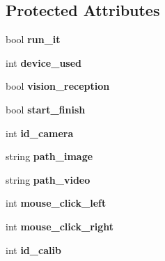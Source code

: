 \subsection*{Protected Attributes}
\begin{DoxyCompactItemize}
\item 
bool {\bfseries run\+\_\+it}\hypertarget{classcalibration_a3b4703e9670b0c80359bae2747878245}{}\label{classcalibration_a3b4703e9670b0c80359bae2747878245}

\item 
int {\bfseries device\+\_\+used}\hypertarget{classcalibration_a5f6ca76dc8c0fbf33f1c6a604b72cdc0}{}\label{classcalibration_a5f6ca76dc8c0fbf33f1c6a604b72cdc0}

\item 
bool {\bfseries vision\+\_\+reception}\hypertarget{classcalibration_a9606829157d28f46f87febceb67ba14c}{}\label{classcalibration_a9606829157d28f46f87febceb67ba14c}

\item 
bool {\bfseries start\+\_\+finish}\hypertarget{classcalibration_aa3b093eb7694fdcb78408efdeb331e01}{}\label{classcalibration_aa3b093eb7694fdcb78408efdeb331e01}

\item 
int {\bfseries id\+\_\+camera}\hypertarget{classcalibration_abb71e83b1caac73be1f8a5ec9ff85f5f}{}\label{classcalibration_abb71e83b1caac73be1f8a5ec9ff85f5f}

\item 
string {\bfseries path\+\_\+image}\hypertarget{classcalibration_ab5b38c34686e2d0ef790f5ea1bf022d2}{}\label{classcalibration_ab5b38c34686e2d0ef790f5ea1bf022d2}

\item 
string {\bfseries path\+\_\+video}\hypertarget{classcalibration_ac3b22d58acc42fb7c8217518f6ea4846}{}\label{classcalibration_ac3b22d58acc42fb7c8217518f6ea4846}

\item 
int {\bfseries mouse\+\_\+click\+\_\+left}\hypertarget{classcalibration_ada27036ba780db458e9dc14f13f0809a}{}\label{classcalibration_ada27036ba780db458e9dc14f13f0809a}

\item 
int {\bfseries mouse\+\_\+click\+\_\+right}\hypertarget{classcalibration_a40702565952927ef98184ddeb27d5581}{}\label{classcalibration_a40702565952927ef98184ddeb27d5581}

\item 
int {\bfseries id\+\_\+calib}\hypertarget{classcalibration_a574fce12317e7968bd7553fbf715ab64}{}\label{classcalibration_a574fce12317e7968bd7553fbf715ab64}


\end{DoxyCompactItemize}
